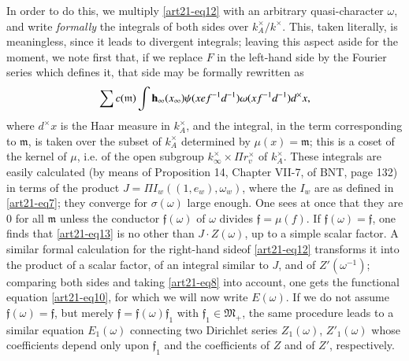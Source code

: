 In order to do this, we multiply \eqref{art21-eq12} with an arbitrary quasi-character $\omega$, and write {\em formally} the integrals of both sides over $k^{\times}_{A}/k^{\times}$. This, taken literally, is meaningless, since it leads to divergent integrals; leaving this aspect aside for the moment, we note first that, if we replace $F$ in the left-hand side by the Fourier series which defines it, that side may be formally rewritten as 
\begin{equation}
\sum c(\mathfrak{m})\int \mathbf{h}_{\infty}(x_{\infty})\psi (xef^{-1}d^{-1})\omega(xf^{-1}d^{-1})d^{\times}x,\label{art21-eq13}
\end{equation}
where $d^{\times}x$ is the Haar measure in $k^{\times}_{A}$, and the integral, in the term corresponding to $\mathfrak{m}$, is taken over the subset of $k^{\times}_{A}$ determined by $\mu(x)=\mathfrak{m}$; this is a coset of the kernel of $\mu$, i.e. of the open subgroup $k^{\times}_{\infty}\times \Pi r^{\times}_{v}$ of $k^{\times}_{A}$. These integrals are easily calculated (by means of Proposition 14, Chapter VII-7, of BNT, page 132) in terms of the product $J=\Pi I_{w}((1,e_{w}),\omega_{w})$, where the $I_{w}$ are as defined in \eqref{art21-eq7}; they converge for $\sigma(\omega)$ large enough. One sees at once that they are $0$ for all $\mathfrak{m}$ unless the conductor $\mathfrak{f}(\omega)$ of $\omega$ divides $\mathfrak{f}=\mu(f)$. If $\mathfrak{f}(\omega)=\mathfrak{f}$, one finds that \eqref{art21-eq13} is no other than $J\cdot Z(\omega)$, up to a simple scalar factor. A similar formal calculation for the right-hand side\pageoriginale of \eqref{art21-eq12} transforms it into the product of a scalar factor, of an integral similar to $J$, and of $Z'(\omega^{-1})$; comparing both sides and taking \eqref{art21-eq8} into account, one gets the functional equation \eqref{art21-eq10}, for which we will now write $E(\omega)$. If we do not assume $\mathfrak{f}(\omega)=\mathfrak{f}$, but merely $\mathfrak{f}=\mathfrak{f}(\omega)\mathfrak{f}_{1}$ with $\mathfrak{f}_{1}\in \mathfrak{M}_{+}$, the same procedure leads to a similar equation $E_{1}(\omega)$ connecting two Dirichlet series $Z_{1}(\omega)$, $Z'_{1}(\omega)$ whose coefficients depend only upon $\mathfrak{f}_{1}$ and the coefficients of $Z$ and of $Z'$, respectively.

